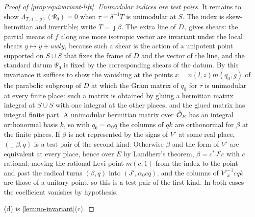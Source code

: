 \begin{proof}[Proof of \cref{prop:equivariant-lift}]
\emph{Unimodular indices are test pairs.} It remains to show $\Lambda_{T,(1,g)}(\Psi_0)=0$ when $\tau=\delta^{-1}T$ is unimodular at $S$. The index is skew-hermitian and invertible; write $T=\jmath\beta$. The extra line of
$D_1$ gives shears: the partial means of $f$ along one more isotropic vector are invariant under the local shears $y\mapsto y+uwly$, because such a shear is the action of a unipotent point supported on $S\cup\bar S$
that fixes the frame of $D$ and the vector of the line, and the standard datum $\Psi_0$ is fixed by the corresponding shears of the datum. By this invariance it suffices to show the vanishing at the
points $x=n(l,z)m(q_0,g)$ of the parabolic subgroup of $D$ at which the Gram matrix of $q_0$ for $\tau$ is unimodular at every finite place: such a matrix is obtained by gluing a hermitian matrix integral
at $S\cup\bar S$ with one integral at the other places, and the glued matrix has integral finite part. A unimodular hermitian matrix over $\hat{\mathcal{O}}_E$ has an integral orthonormal basis $k$, so with
$q_0=\alpha_0q$ the columns of $qk$ are orthonormal for $\beta$ at the finite places. If $\beta$ is not represented by the signs of $V'$ at some real place, $(\jmath\beta,q)$
is a test pair of the second kind. Otherwise $\beta$ and the form of $V'$ are equivalent at every place, hence over $E$ by Landherr's theorem, $\beta=c^*J'c$ with $c$ rational; moving the rational Levi point
$m(c,1)$ from the index to the point and past the radical turns $(\beta,q)$ into $(J',\alpha_0cq)$, and the columns of $V'^{-1}_xcqk$ are those of a unitary point, so this is a test pair of the first kind. In both
cases the coefficient vanishes by hypothesis.

(d) is \cref{lem:no-invariant}(c).
\end{proof}

